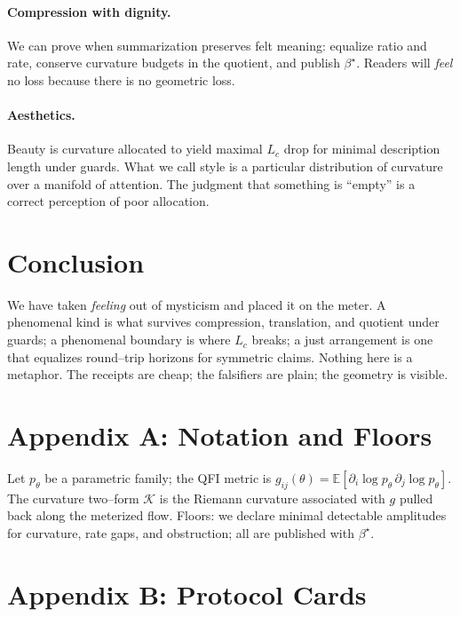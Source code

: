 \documentclass[11pt]{article}
\newcommand{\1}{\mathbf{1}}
\begin{document}
\paragraph{Compression with dignity.} We can prove when summarization preserves felt meaning: equalize ratio and rate, conserve curvature budgets in the quotient, and publish $\beta^\star$. Readers will \emph{feel} no loss because there is no geometric loss.

\paragraph{Aesthetics.} Beauty is curvature allocated to yield maximal $L_c$ drop for minimal description length under guards. What we call style is a particular distribution of curvature over a manifold of attention. The judgment that something is ``empty'' is a correct perception of poor allocation.

\section{Conclusion}
\label{sec:conclusion}

We have taken \emph{feeling} out of mysticism and placed it on the meter. A phenomenal kind is what survives compression, translation, and quotient under guards; a phenomenal boundary is where $L_c$ breaks; a just arrangement is one that equalizes round--trip horizons for symmetric claims. Nothing here is a metaphor. The receipts are cheap; the falsifiers are plain; the geometry is visible.

\appendix

\section{Appendix A: Notation and Floors}
\label{app:notation}

Let $p_\theta$ be a parametric family; the QFI metric is $g_{ij}(\theta)=\mathbb{E}[\partial_i \log p_\theta\,\partial_j \log p_\theta]$. The curvature two--form $\mathcal{K}$ is the Riemann curvature associated with $g$ pulled back along the meterized flow. Floors: we declare minimal detectable amplitudes for curvature, rate gaps, and obstruction; all are published with $\beta^\star$.

\section{Appendix B: Protocol Cards}
\label{app:protocol}
\end{document}
